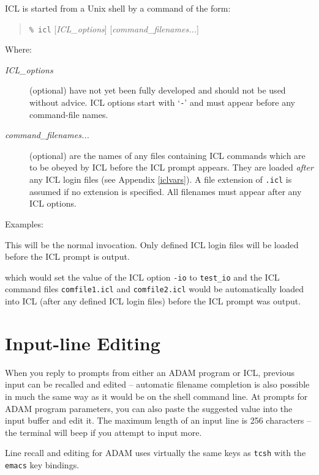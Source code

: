 \documentclass[twoside,11pt,nolof]{starlink}
\begin{document}
ICL is started from a Unix shell by a command of the form:
\begin{quote}
\texttt{\% icl} [\textit{ICL\_options}\/] [\textit{command\_filenames...}]
\end{quote}
Where:
\begin{description}
\item[\textit{ICL\_options}] (optional) have not yet been fully developed
and should not be used without advice. ICL options start
with `{\texttt{-}}' and must appear before any command-file names.
\item[\textit{command\_filenames...}] (optional) are the names of any files
containing ICL commands which are to be obeyed by ICL before the ICL prompt
appears.
They are loaded \emph{after} any ICL login files (see Appendix \ref{iclvars}).
A file extension of \texttt{.icl} is assumed if no extension is specified.
All filenames must appear after any ICL options.
\end{description}
Examples:
\begin{terminalv}
\end{terminalv}
This will be the normal invocation. Only defined ICL login files
will be loaded before the ICL prompt is output.

\begin{terminalv}
\end{terminalv}
which would set the value of the ICL option \texttt{-io} to \texttt{test\_io}
and the ICL command files \texttt{comfile1.icl} and \texttt{comfile2.icl}
would be automatically loaded into ICL (after any defined ICL login files)
before the ICL prompt was output.

\section{\label{input_line_editing}Input-line Editing}
When you reply to prompts from either an ADAM program or ICL, previous input can
be recalled and edited -- automatic filename completion is also possible in
much the same way as it would be on the shell command line.
At prompts for ADAM program parameters, you can also paste the suggested value
into the input buffer and edit it. The maximum length of an input line is 256
characters -- the terminal will beep if you attempt to input more.

Line recall and editing for ADAM uses virtually the same keys as \texttt{tcsh}
with the \texttt{emacs} key bindings.
\end{document}
